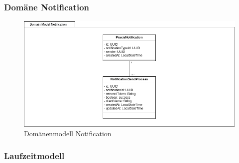 \clearpage
\subsubsection*{Domäne Notification}

\begin{figure}[h]
    \centering
    \begin{minipage}[b]{1.0\textwidth}
        \includegraphics[width=\textwidth]{graphics/Class_Notification_Domain}
        \caption{Domänenmodell Notification}
    \end{minipage}
\end{figure}


\clearpage
\subsubsection{Laufzeitmodell}

\clearpage
